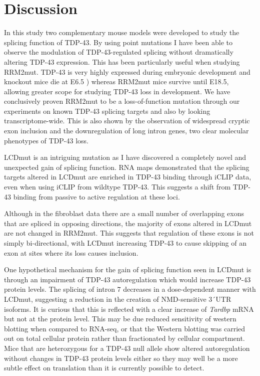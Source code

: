 \clearpage

\section{Discussion}

In this study  two complementary mouse models were developed to study the splicing function of TDP-43. 
By using point mutations I have been able to observe the modulation of TDP-43-regulated splicing without dramatically altering TDP-43 expression. 
This has been particularly useful when studying RRM2mut. 
TDP-43 is very highly expressed during embryonic development and knockout mice die at E6.5 \citep{Ricketts2014}) whereas RRM2mut mice survive until E18.5, allowing greater scope for studying TDP-43 loss in development.
We have conclusively proven RRM2mut to be a loss-of-function mutation through our experiments on known TDP-43 splicing targets and also by looking transcriptome-wide. 
This is also shown by the observation of widespread cryptic exon inclusion and the downregulation of long intron genes, two clear molecular phenotypes of TDP-43 loss.

LCDmut is an intriguing mutation as I have discovered a completely novel and unexpected gain of splicing function. 
RNA maps demonstrated that the splicing targets altered in LCDmut are enriched in TDP-43 binding through iCLIP data, even when using iCLIP from wildtype TDP-43. 
This suggests a shift from TDP-43 binding from passive to active regulation at these loci.

Although in the fibroblast data there are a small number of overlapping exons that are spliced in opposing directions, the majority of exons altered in LCDmut are not changed in RRM2mut. 
This suggests that regulation of these exons is not simply bi-directional, with LCDmut increasing TDP-43 to cause skipping of an exon at sites where its loss causes inclusion.

One hypothetical mechanism for the gain of splicing function seen in LCDmut is through an impairment of TDP-43 autoregulation which would increase TDP-43 protein levels.
The splicing of intron 7 decreases in a dose-dependent manner with LCDmut, suggesting a reduction in the creation of NMD-sensitive 3\'\ UTR isoforms.
It is curious that this is reflected with a clear increase of \textit{Tardbp} mRNA but not at the protein level.
This may be due reduced sensitivity of western blotting when compared to RNA-seq, or that the Western blotting was carried out on total cellular protein rather than fractionated by cellular compartment.
Mice that are heterozygous for a TDP-43 null allele show altered autoregulation without changes in TDP-43 protein levels either \citep{Ricketts2014} so they may well be a more subtle effect on translation than it is currently possible to detect. 

